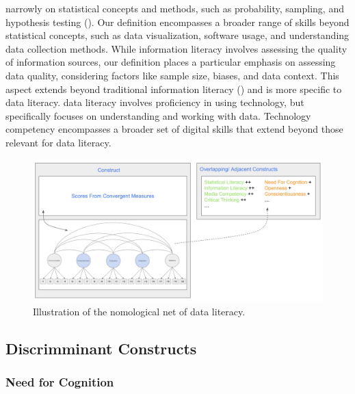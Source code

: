 \documentclass[
  12pt,
  a4paper,
  twoside]{article}
\begin{document}
narrowly on statistical concepts and methods, such as probability,
sampling, and hypothesis testing ().
Our definition encompasses a broader range of skills beyond statistical
concepts, such as data visualization, software usage, and understanding
data collection methods. While information literacy involves assessing
the quality of information sources, our definition places a particular
emphasis on assessing data quality, considering factors like sample
size, biases, and data context. This aspect extends beyond traditional
information literacy () and is more specific to data literacy. data
literacy involves proficiency in using technology, but specifically
focuses on understanding and working with data. Technology competency
encompasses a broader set of digital skills that extend beyond those
relevant for data literacy.

\begin{figure}

{\centering \includegraphics[width=1\linewidth]{images/DL_Nomological_Net} 

}

\caption{Illustration of the nomological net of data literacy.  }\label{fig:workflow}
\end{figure}

\subsection{Discrimminant Constructs}\label{discrimminant-constructs}

\subsubsection{Need for Cognition}\label{need-for-cognition}
\end{document}
